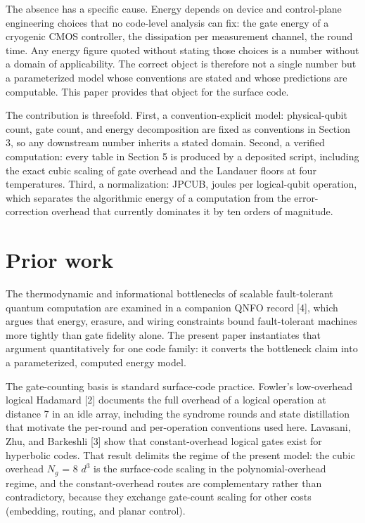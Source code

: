 \documentclass[11pt]{article}
\begin{document}
The absence has a specific cause. Energy depends on device and control-plane engineering choices that no code-level analysis can fix: the gate energy of a cryogenic CMOS controller, the dissipation per measurement channel, the round time. Any energy figure quoted without stating those choices is a number without a domain of applicability. The correct object is therefore not a single number but a parameterized model whose conventions are stated and whose predictions are computable. This paper provides that object for the surface code.

The contribution is threefold. First, a convention-explicit model: physical-qubit count, gate count, and energy decomposition are fixed as conventions in Section 3, so any downstream number inherits a stated domain. Second, a verified computation: every table in Section 5 is produced by a deposited script, including the exact cubic scaling of gate overhead and the Landauer floors at four temperatures. Third, a normalization: JPCUB, joules per logical-qubit operation, which separates the algorithmic energy of a computation from the error-correction overhead that currently dominates it by ten orders of magnitude.

\section{Prior work}
The thermodynamic and informational bottlenecks of scalable fault-tolerant quantum computation are examined in a companion QNFO record [4], which argues that energy, erasure, and wiring constraints bound fault-tolerant machines more tightly than gate fidelity alone. The present paper instantiates that argument quantitatively for one code family: it converts the bottleneck claim into a parameterized, computed energy model.

The gate-counting basis is standard surface-code practice. Fowler's low-overhead logical Hadamard [2] documents the full overhead of a logical operation at distance 7 in an idle array, including the syndrome rounds and state distillation that motivate the per-round and per-operation conventions used here. Lavasani, Zhu, and Barkeshli [3] show that constant-overhead logical gates exist for hyperbolic codes. That result delimits the regime of the present model: the cubic overhead $N_{g}$ = 8 $d^{3}$ is the surface-code scaling in the polynomial-overhead regime, and the constant-overhead routes are complementary rather than contradictory, because they exchange gate-count scaling for other costs (embedding, routing, and planar control).
\end{document}
